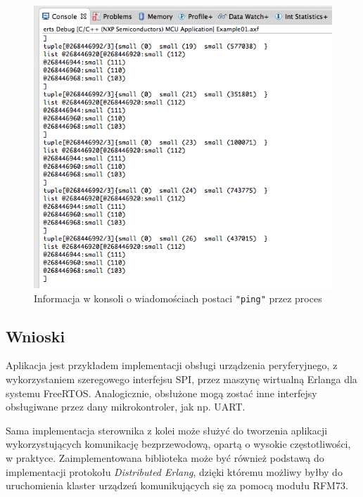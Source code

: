 \begin{figure}[h]
\centerline{\includegraphics[scale=0.7]{console_rfm}}
\caption{Informacja w konsoli o wiadomościach postaci \texttt{"ping"} przez proces}
\label{fig:consolerfm}
\end{figure}


\subsection{Wnioski}
Aplikacja jest przykładem implementacji obsługi urządzenia peryferyjnego, z wykorzystaniem szeregowego interfejsu SPI, przez maszynę wirtualną Erlanga dla systemu FreeRTOS.
Analogicznie, obsłużone mogą zostać inne interfejsy obsługiwane przez dany mikrokontroler, jak np. UART. 

Sama implementacja sterownika z kolei może służyć do tworzenia aplikacji wykorzystujących komunikację bezprzewodową, opartą o wysokie częstotliwości, w praktyce.
Zaimplementowana biblioteka może być również podstawą do implementacji protokołu \emph{Distributed Erlang}, dzięki któremu możliwy byłby do uruchomienia klaster urządzeń komunikujących się za pomocą modułu RFM73.